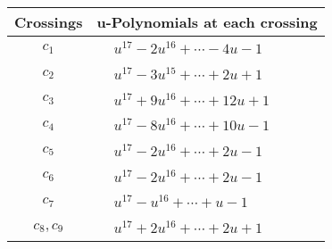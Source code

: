 \documentclass[1p]{elsarticle_modified}
\theoremstyle{definition}
\begin{document}
\begin{tabular}{m{50pt}|m{274pt}}
Crossings & \hspace{64pt}u-Polynomials at each crossing \\
\hline $$\begin{aligned}c_{1}\end{aligned}$$&$\begin{aligned}
&u^{17}-2 u^{16}+\cdots-4 u-1
\end{aligned}$\\
\hline $$\begin{aligned}c_{2}\end{aligned}$$&$\begin{aligned}
&u^{17}-3 u^{15}+\cdots+2 u+1
\end{aligned}$\\
\hline $$\begin{aligned}c_{3}\end{aligned}$$&$\begin{aligned}
&u^{17}+9 u^{16}+\cdots+12 u+1
\end{aligned}$\\
\hline $$\begin{aligned}c_{4}\end{aligned}$$&$\begin{aligned}
&u^{17}-8 u^{16}+\cdots+10 u-1
\end{aligned}$\\
\hline $$\begin{aligned}c_{5}\end{aligned}$$&$\begin{aligned}
&u^{17}-2 u^{16}+\cdots+2 u-1
\end{aligned}$\\
\hline $$\begin{aligned}c_{6}\end{aligned}$$&$\begin{aligned}
&u^{17}-2 u^{16}+\cdots+2 u-1
\end{aligned}$\\
\hline $$\begin{aligned}c_{7}\end{aligned}$$&$\begin{aligned}
&u^{17}- u^{16}+\cdots+u-1
\end{aligned}$\\
\hline $$\begin{aligned}c_{8},c_{9}\end{aligned}$$&$\begin{aligned}
&u^{17}+2 u^{16}+\cdots+2 u+1
\end{aligned}$\\

\end{tabular}
\end{document}
